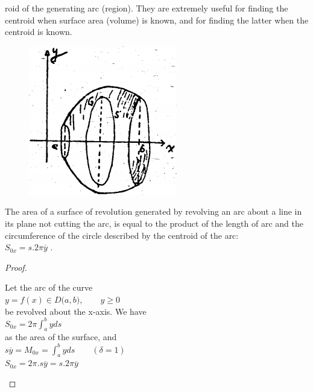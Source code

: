\documentclass[9pt]{amsbook}
\begin{document}
\newtheorem{theorem}{Theorem}
\setcounter{section}{8}
\setcounter{page}{501}

roid of the generating arc (region). They are extremely useful
for finding the centroid when surface area (volume) is known,
and for finding the latter when the centroid is known. \\
\begin{figure}
	\includegraphics{images/b1p2-501-fig01.png}
\end{figure}
\begin{thm}
		The area of a surface of revolution generated
	by revolving an arc about a line in its plane not cutting the
	arc, is equal to the product of the length of arc and the circumference
	of the circle described by the centroid of the arc: \\
		$S_{0x} = s . 2 \pi \overline{y}$ .

\end{thm}
\begin{proof}
\begin{flushleft}
	{
		Let the arc of the curve \\
		$ y = f(x)\in D\big(a, b\big) , \qquad y\geq0$ \\
		be revolved about the x-axis. We have \\
		$S_{0x} = 2\pi \int_{a}^{b} y ds$ \\
		as the area of the surface, and \\
		$s \overline{y} = M_{0x} = \int_{a}^{b} y ds \qquad (\delta = 1)$ \\
		$S_{0x} = 2\pi . s\overline{y} = s . 2\pi \overline{y}$ \\
	}
\end{flushleft}
\end{proof}
\end{document}
